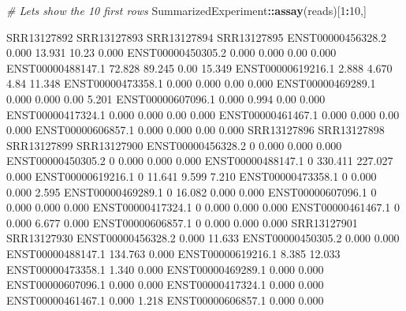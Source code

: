 \documentclass[
]{article}
\newenvironment{Shaded}{\begin{snugshade}}{\end{snugshade}}
\newcommand{\CommentTok}[1]{\textcolor[rgb]{0.56,0.35,0.01}{\textit{#1}}}
\newcommand{\DecValTok}[1]{\textcolor[rgb]{0.00,0.00,0.81}{#1}}
\newcommand{\FunctionTok}[1]{\textcolor[rgb]{0.13,0.29,0.53}{\textbf{#1}}}
\newcommand{\NormalTok}[1]{#1}
\newcommand{\SpecialCharTok}[1]{\textcolor[rgb]{0.81,0.36,0.00}{\textbf{#1}}}
\begin{document}
\begin{Shaded}
\begin{Highlighting}[]
\CommentTok{\# Let\textquotesingle{}s show the 10 first rows}
\NormalTok{SummarizedExperiment}\SpecialCharTok{::}\FunctionTok{assay}\NormalTok{(reads)[}\DecValTok{1}\SpecialCharTok{:}\DecValTok{10}\NormalTok{,]}
\end{Highlighting}
\end{Shaded}

\begin{Shaded}
\begin{Highlighting}[]
\NormalTok{                  SRR13127892 SRR13127893 SRR13127894 SRR13127895}
\NormalTok{ENST00000456328.2       0.000      13.931       10.23       0.000}
\NormalTok{ENST00000450305.2       0.000       0.000        0.00       0.000}
\NormalTok{ENST00000488147.1      72.828      89.245        0.00      15.349}
\NormalTok{ENST00000619216.1       2.888       4.670        4.84      11.348}
\NormalTok{ENST00000473358.1       0.000       0.000        0.00       0.000}
\NormalTok{ENST00000469289.1       0.000       0.000        0.00       5.201}
\NormalTok{ENST00000607096.1       0.000       0.994        0.00       0.000}
\NormalTok{ENST00000417324.1       0.000       0.000        0.00       0.000}
\NormalTok{ENST00000461467.1       0.000       0.000        0.00       0.000}
\NormalTok{ENST00000606857.1       0.000       0.000        0.00       0.000}
\NormalTok{                  SRR13127896 SRR13127898 SRR13127899 SRR13127900}
\NormalTok{ENST00000456328.2           0       0.000       0.000       0.000}
\NormalTok{ENST00000450305.2           0       0.000       0.000       0.000}
\NormalTok{ENST00000488147.1           0     330.411     227.027       0.000}
\NormalTok{ENST00000619216.1           0      11.641       9.599       7.210}
\NormalTok{ENST00000473358.1           0       0.000       0.000       2.595}
\NormalTok{ENST00000469289.1           0      16.082       0.000       0.000}
\NormalTok{ENST00000607096.1           0       0.000       0.000       0.000}
\NormalTok{ENST00000417324.1           0       0.000       0.000       0.000}
\NormalTok{ENST00000461467.1           0       0.000       6.677       0.000}
\NormalTok{ENST00000606857.1           0       0.000       0.000       0.000}
\NormalTok{                  SRR13127901 SRR13127930}
\NormalTok{ENST00000456328.2       0.000      11.633}
\NormalTok{ENST00000450305.2       0.000       0.000}
\NormalTok{ENST00000488147.1     134.763       0.000}
\NormalTok{ENST00000619216.1       8.385      12.033}
\NormalTok{ENST00000473358.1       1.340       0.000}
\NormalTok{ENST00000469289.1       0.000       0.000}
\NormalTok{ENST00000607096.1       0.000       0.000}
\NormalTok{ENST00000417324.1       0.000       0.000}
\NormalTok{ENST00000461467.1       0.000       1.218}
\NormalTok{ENST00000606857.1       0.000       0.000}
\end{Highlighting}
\end{Shaded}
\end{document}
